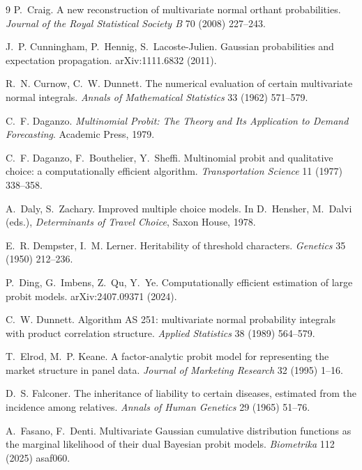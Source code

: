 \documentclass[12pt]{article}
\theoremstyle{remark}
\begin{document}
\begin{thebibliography}{9}
 P.~Craig. A new reconstruction of
multivariate normal orthant probabilities. \emph{Journal of the Royal
Statistical Society B} 70 (2008) 227--243.

 J.~P. Cunningham, P.~Hennig, S.~Lacoste-Julien.
Gaussian probabilities and expectation propagation. arXiv:1111.6832 (2011).

 R.~N. Curnow, C.~W.
Dunnett. The numerical evaluation of certain multivariate normal
integrals. \emph{Annals of Mathematical Statistics} 33 (1962) 571--579.

 C.~F. Daganzo. \emph{Multinomial
Probit: The Theory and Its Application to Demand Forecasting}. Academic
Press, 1979.

 C.~F. Daganzo, F.~Bouthelier, Y.~Sheffi.
Multinomial probit and qualitative choice: a computationally efficient
algorithm. \emph{Transportation Science} 11 (1977) 338--358.

 A.~Daly, S.~Zachary.
Improved multiple choice models. In D.~Hensher, M.~Dalvi (eds.),
\emph{Determinants of Travel Choice}, Saxon House, 1978.

 E.~R. Dempster,
I.~M. Lerner. Heritability of threshold characters. \emph{Genetics} 35
(1950) 212--236.

 P.~Ding,
G.~Imbens, Z.~Qu, Y.~Ye. Computationally efficient estimation of large
probit models. arXiv:2407.09371 (2024).

 C.~W. Dunnett. Algorithm AS 251:
multivariate normal probability integrals with product correlation
structure. \emph{Applied Statistics} 38 (1989) 564--579.

 T.~Elrod, M.~P. Keane. A factor-analytic probit model for
representing the market structure in panel data. \emph{Journal of Marketing
Research} 32 (1995) 1--16.

 D.~S. Falconer. The inheritance
of liability to certain diseases, estimated from the incidence among
relatives. \emph{Annals of Human Genetics} 29 (1965) 51--76.

 A.~Fasano, F.~Denti. Multivariate Gaussian
cumulative distribution functions as the marginal likelihood of their
dual Bayesian probit models. \emph{Biometrika} 112 (2025) asaf060.


\end{thebibliography}
\end{document}
